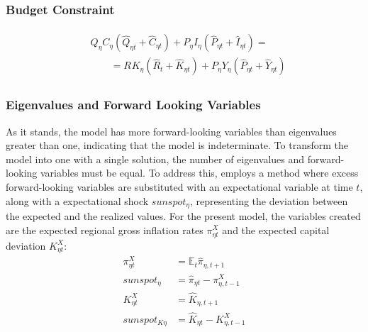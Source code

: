 \documentclass[../thesis.tex]{subfiles}
\begin{document}
\subsubsection*{Budget Constraint}

\begin{align}
	\begin{split}
		& Q_{\eta} C_{\eta} (\hat{Q}_{\eta t} + \hat{C}_{\eta t}) + P_{\eta} I_{\eta} (\hat{P}_{\eta t} + \hat{I}_{\eta t}) = \\
		& \qquad = R_{} K_{\eta} (\hat{R}_{t} + \hat{K}_{\eta t}) + P_{\eta} Y_{\eta} (\hat{P}_{\eta t} + \hat{Y}_{\eta t})
	\end{split} \label{eq_v2:reg-ll-budget-constraint-3}
\end{align}

\subsubsection{Eigenvalues and Forward Looking Variables}

As it stands, the model has more forward-looking variables than eigenvalues greater than one, indicating that the model is indeterminate. To transform the model into one with a single solution, the number of eigenvalues and forward-looking variables must be equal. To address this, \textcite{farmer_solving_2015} employs a method where excess forward-looking variables are substituted with an expectational variable at time $t$, along with a expectational shock $sunspot_{\eta}$, representing the deviation between the expected and the realized values. For the present model, the variables created are the expected regional gross inflation rates $\pi_{\eta t}^{X}$ and the expected capital deviation $K_{\eta t}^{X}$:
\begin{align}
	\pi_{\eta t}^{X} &= \mathbb{E}_t \hat{\pi}_{\eta, t+1} \label{eq_v2:reg-pix} \\
	sunspot_{\eta} &= \hat{\pi}_{\eta t} - \pi_{\eta, t-1}^{X} \label{eq_v2:sunspot} \\
	K_{\eta t}^{X} &= \hat{K}_{\eta, t+1} \label{eq_v2:reg-capital-x} \\
	sunspot_{K\eta} &= \hat{K}_{\eta t} - K_{\eta, t-1}^{X} \label{eq_v2:sunspot-k}
\end{align}
\end{document}
